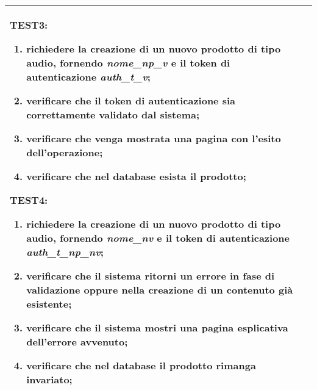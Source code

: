 \begin{table}[hb]
\begin{tabular}{ |p{2cm}|p{10cm}|  }
        TEST3:
        \begin{enumerate}[nosep, topsep=0pt]
            \item richiedere la creazione di un nuovo prodotto di tipo audio, fornendo \emph{nome\_np\_v} e il token di autenticazione \emph{auth\_t\_v};
            \item verificare che il token di autenticazione sia correttamente validato dal sistema;
            \item verificare che venga mostrata una pagina con l'esito dell'operazione;
            \item verificare che nel database esista il prodotto;        
        \end{enumerate}
        \vspace{0.5cm} TEST4:
        \begin{enumerate}[nosep, topsep=0pt]
            \item richiedere la creazione di un nuovo prodotto di tipo audio, fornendo \emph{nome\_nv} e il token di autenticazione \emph{auth\_t\_np\_nv};
            \item verificare che il sistema ritorni un errore in fase di validazione oppure nella creazione di un contenuto già esistente;
            \item verificare che il sistema mostri una pagina esplicativa dell'errore avvenuto;
            \item verificare che nel database il prodotto rimanga invariato;
        \end{enumerate}
        \\\hline
    \end{tabular}
\end{table}

